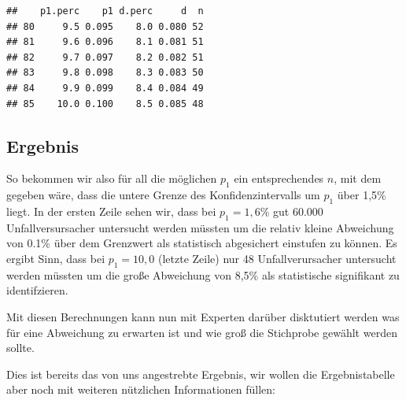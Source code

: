 \documentclass[
]{article}
\newenvironment{Shaded}{\begin{snugshade}}{\end{snugshade}}
\newcommand{\CommentTok}[1]{\textcolor[rgb]{0.56,0.35,0.01}{\textit{#1}}}
\newcommand{\DataTypeTok}[1]{\textcolor[rgb]{0.13,0.29,0.53}{#1}}
\newcommand{\DecValTok}[1]{\textcolor[rgb]{0.00,0.00,0.81}{#1}}
\newcommand{\FloatTok}[1]{\textcolor[rgb]{0.00,0.00,0.81}{#1}}
\newcommand{\KeywordTok}[1]{\textcolor[rgb]{0.13,0.29,0.53}{\textbf{#1}}}
\newcommand{\NormalTok}[1]{#1}
\newcommand{\OperatorTok}[1]{\textcolor[rgb]{0.81,0.36,0.00}{\textbf{#1}}}
\newcommand{\StringTok}[1]{\textcolor[rgb]{0.31,0.60,0.02}{#1}}
\begin{document}
\begin{verbatim}
##    p1.perc    p1 d.perc     d  n
## 80     9.5 0.095    8.0 0.080 52
## 81     9.6 0.096    8.1 0.081 51
## 82     9.7 0.097    8.2 0.082 51
## 83     9.8 0.098    8.3 0.083 50
## 84     9.9 0.099    8.4 0.084 49
## 85    10.0 0.100    8.5 0.085 48
\end{verbatim}

\hypertarget{ergebnis}{%
\subsection{Ergebnis}\label{ergebnis}}

So bekommen wir also für all die möglichen \(p_1\) ein entsprechendes
\(n\), mit dem gegeben wäre, dass die untere Grenze des
Konfidenzintervalls um \(p_1\) über 1,5\% liegt. In der ersten Zeile
sehen wir, dass bei \(p_1=1,6\%\) gut 60.000 Unfallversursacher
untersucht werden müssten um die relativ kleine Abweichung von 0.1\%
über dem Grenzwert als statistisch abgesichert einstufen zu können. Es
ergibt Sinn, dass bei \(p_1=10,0%
\) (letzte Zeile) nur 48 Unfallverursacher untersucht werden müssten um
die große Abweichung von 8,5\% als statistische signifikant zu
identifzieren.

Mit diesen Berechnungen kann nun mit Experten darüber disktutiert werden
was für eine Abweichung zu erwarten ist und wie groß die Stichprobe
gewählt werden sollte.

Dies ist bereits das von uns angestrebte Ergebnis, wir wollen die
Ergebnistabelle aber noch mit weiteren nützlichen Informationen füllen:

\begin{Shaded}
\end{Shaded}
\end{document}
